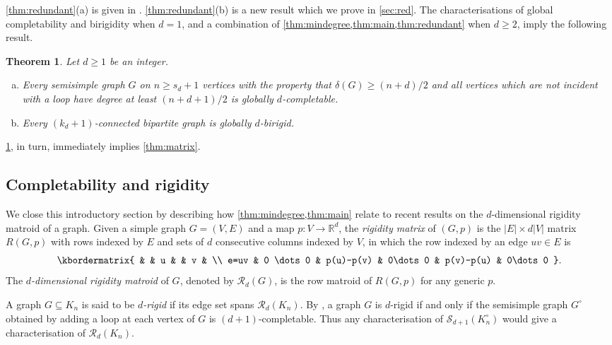 \documentclass[11pt,a4paper,dvipsnames]{scrartcl}
\newtheorem{theorem}{Theorem}[section]
\newcommand{\R}{{\mathbb{R}}}
\newcommand{\cR}{{\mathcal{R}}}
\newcommand{\cS}{{\mathcal{S}}}
\begin{document}
\noindent
\cref{thm:redundant}(a) is given in \cite[Theorem 31]{JJT2}. \cref{thm:redundant}(b) is a new result which we prove in \cref{sec:red}.
The characterisations of global completability and birigidity when $d=1$, and a combination of \cref{thm:mindegree,thm:main,thm:redundant} when $d\geq 2$, imply the following result.

\begin{theorem} \label{thm:glob} Let $d\geq 1$ be an integer. 
\begin{enumerate}[(a)] \itemsep0pt
\item Every semisimple graph $G$ on $n \geq s_d+1$ vertices with the property that $\delta(G) \geq (n+d)/2$ and all vertices which are not incident with a loop have degree at least $ (n+d+1)/2$ is  globally $d$-completable.
\item Every $(k_d+1)$-connected bipartite graph  is globally $d$-birigid.
\end{enumerate}
\end{theorem}

\noindent
\cref{thm:glob}, in turn, immediately implies \cref{thm:matrix}.

\noindent



\subsection{Completability and rigidity}
We close this introductory section by describing how \cref{thm:mindegree,thm:main} relate to recent results on the $d$-dimensional rigidity matroid of a graph.
Given a %
simple graph $G=(V,E)$ and a map $p:V\to \R^d$,  
the {\em rigidity  matrix} of $(G,p)$ is 
the $|E|\times d|V|$ matrix $R(G,p)$ with rows indexed by $E$ and sets of $d$ consecutive columns indexed by $V$, in which the row indexed by an edge $uv\in E$ is 
\vspace{-.5em}
\[ 
\kbordermatrix{
& &  u & & v & \\
e=uv & 0 \dots 0 & p(u)-p(v) & 0\dots 0 & p(v)-p(u) & 0\dots 0
}.
\]
The {\em $d$-dimensional  rigidity  matroid} of $G$, denoted by $\cR_d(G)$, is the row matroid of $R(G,p)$ for any generic $p$.

A graph $G\subseteq K_n$ is said to be {\em $d$-rigid} if its edge set spans $\cR_d(K_n)$. By \cite[Corollary 2.6]{JJT}, a graph $G$ is $d$-rigid if and only if the semisimple graph $G^\circ$ obtained by adding a loop at each vertex of $G$ is $(d+1)$-completable. Thus any characterisation of $\cS_{d+1}(K_n^\circ)$ would give a characterisation of $\cR_{d}(K_n)$.
\end{document}
